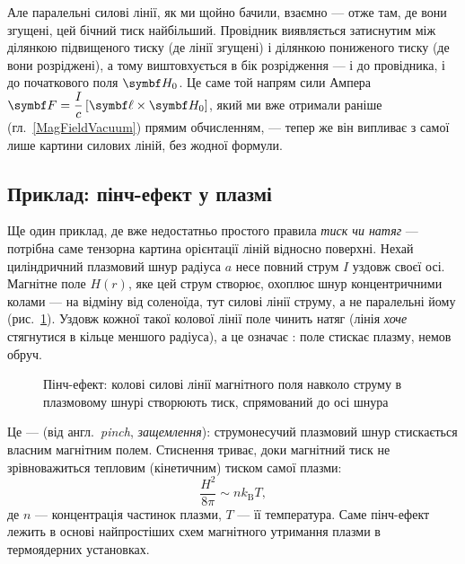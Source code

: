 \documentclass[]{ConspectBook}
\let\enquote\emph
\begin{document}
Але паралельні силові лінії, як ми щойно бачили, взаємно  --- отже там, де вони згущені, цей бічний тиск
найбільший. Провідник виявляється затиснутим між ділянкою підвищеного тиску (де лінії згущені) і ділянкою пониженого тиску (де вони розріджені),
а тому виштовхується в бік розрідження ---  і до провідника, і до початкового поля $\Hfield_0$. Це саме той напрям сили
Ампера $\vect F = \dfrac{I}{c}\left[\vect\ell\times\Hfield_0\right]$, який ми вже отримали раніше (гл.~\ref{MagFieldVacuum}) прямим
обчисленням, --- тепер же він випливає з самої лише картини силових ліній, без жодної формули.

\subsection*{Приклад: пінч-ефект у плазмі}

Ще один приклад, де вже недостатньо простого правила \enquote{тиск чи натяг} --- потрібна саме тензорна картина орієнтації ліній відносно
поверхні. Нехай циліндричний плазмовий шнур радіуса $a$ несе повний струм $I$ уздовж своєї осі. Магнітне поле $H(r)$, яке цей струм створює,
охоплює шнур концентричними колами --- на відміну від соленоїда, тут силові лінії  струму, а не паралельні йому
(рис.~\ref{pic:PinchEffect}). Уздовж кожної такої колової лінії поле чинить натяг (лінія \enquote{хоче} стягнутися в кільце меншого радіуса), а
це означає : поле стискає плазму, немов обруч.

\begin{figure}[h!]\centering
	\caption{Пінч-ефект: колові силові лінії магнітного поля навколо струму в плазмовому шнурі створюють тиск, спрямований
		до осі шнура\label{pic:PinchEffect}}
\end{figure}

Це ---  (від англ.\ \emph{pinch}, \enquote{защемлення}): струмонесучий плазмовий шнур стискається власним магнітним полем.
Стиснення триває, доки магнітний тиск не зрівноважиться тепловим (кінетичним) тиском самої плазми:
\begin{equation}\label{eq:PinchBalance}
	\frac{H^2}{8\pi} \sim n k_{\text{B}} T,
\end{equation}
де $n$ --- концентрація частинок плазми, $T$ --- її температура. Саме пінч-ефект лежить в основі найпростіших схем магнітного утримання плазми в
термоядерних установках.
\end{document}

